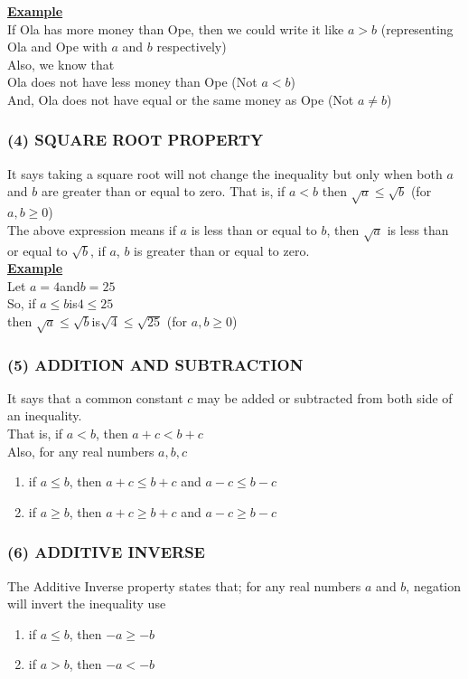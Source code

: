\documentclass[12pt]{report}
\newcommand{\ubt}[1]{\textbf{\underline{#1}}}
\newcommand{\NI}{\noindent}
\begin{document}
	\NI\ubt{Example}\\
	If Ola has more money than Ope, then we could write it like $a>b$ (representing Ola and Ope with $a$ and $b$ respectively)\\
	Also, we know that\\
	
	\NI Ola does not have less money than Ope (Not $a<b$)\\
	And, Ola does not have equal or the same money as Ope (Not $a \neq b$)
	
	\subsubsection{(4) SQUARE ROOT PROPERTY}
	It says taking a square root will not change the inequality but only when both $a$ and $b$ are greater than or equal to zero. That is, if $a<b$ then $\sqrt{a} \leq \sqrt{b}$ (for $a,b\geq 0$)\\
	
	\NI The above expression means if $a$ is less than or equal to $b$, then $\sqrt{a}$ is less than or equal to $\sqrt{b}$, if $a$, $b$ is greater than or equal to zero.\\
	
	\NI\ubt{Example}\\
	Let $a=4$\quad and\quad $b=25$\\
	So, if $a\leq b$\quad is\quad $4\leq 25$\\
	then $\sqrt{a} \leq \sqrt{b}$\quad is\quad $\sqrt{4} \leq \sqrt{25}$ (for $a,b \geq0$)
	
	\subsubsection{(5) ADDITION AND SUBTRACTION}
	It says that a common constant $c$ may be added or subtracted from both side of an inequality.\\
	That is, if $a<b$, then $a+c < b + c$\\
	
	\NI Also, for any real numbers $a, b, c$
	\begin{enumerate}
		\item if $a\leq b$, then $a+c \leq b+c$ and $a-c \leq b-c$
		
		\item if $a\geq b$, then $a+c \geq b+c$ and $a-c \geq b-c$
	\end{enumerate}
	
	\subsubsection{(6) ADDITIVE INVERSE}
	The Additive Inverse property states that; for any real numbers $a$ and $b$, negation will invert the inequality use
	\begin{enumerate}
		\item if $a \leq b$, then $-a \geq -b$
		
		\item if $a>b$, then $-a < -b$
	\end{enumerate}
	
\end{document}
